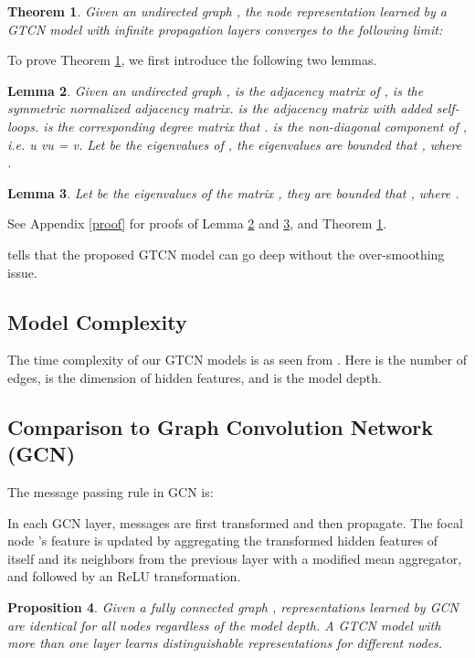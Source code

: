 \documentclass[lettersize,journal]{IEEEtran}
\theoremstyle{plain}
\newtheorem{theorem}{Theorem}
\newtheorem{proposition}[theorem]{Proposition}
\newtheorem{lemma}[theorem]{Lemma}
\theoremstyle{definition}
\theoremstyle{remark}
\begin{document}
\begin{theorem}
\label{thm:deep}
	Given an undirected graph , the node representation learned by a GTCN model with infinite propagation layers converges to the following limit:
	
\end{theorem}

To prove Theorem \ref{thm:deep}, we first introduce the following two lemmas.

\begin{lemma}
	\label{lm:eigen1}
	Given an undirected graph ,  is the adjacency matrix of ,  is the symmetric normalized adjacency matrix.  is the adjacency matrix with added self-loops.  is the corresponding degree matrix that .  is the non-diagonal component of , i.e. 
	u \neq vu = v. Let  be the eigenvalues of , the eigenvalues are bounded that , where .
\end{lemma}

\begin{lemma}
	\label{lm:eigen2}
	Let  be the eigenvalues of the matrix , they are bounded that , where .
\end{lemma}

See Appendix \ref{proof} for proofs of Lemma \ref{lm:eigen1} and \ref{lm:eigen2}, and Theorem \ref{thm:deep}.

 tells that the proposed GTCN model can go deep without the over-smoothing issue.

\subsection{Model Complexity}
The time complexity of our GTCN models is  as seen from . Here  is the number of edges,  is the dimension of hidden features, and  is the model depth. 

\subsection{Comparison to Graph Convolution Network (GCN)}
\label{compare:GCN}
The message passing rule in GCN is:


In each GCN layer, messages are first transformed and then propagate. The focal node 's feature is updated by aggregating the transformed hidden features of itself and its neighbors from the previous layer with a modified mean aggregator, and followed by an ReLU transformation.

\begin{proposition}
	\label{prop:deep}
	Given a fully connected graph , representations learned by GCN are identical for all nodes regardless of the model depth. A GTCN model with more than one layer learns distinguishable representations for different nodes.
\end{proposition}
\end{document}
